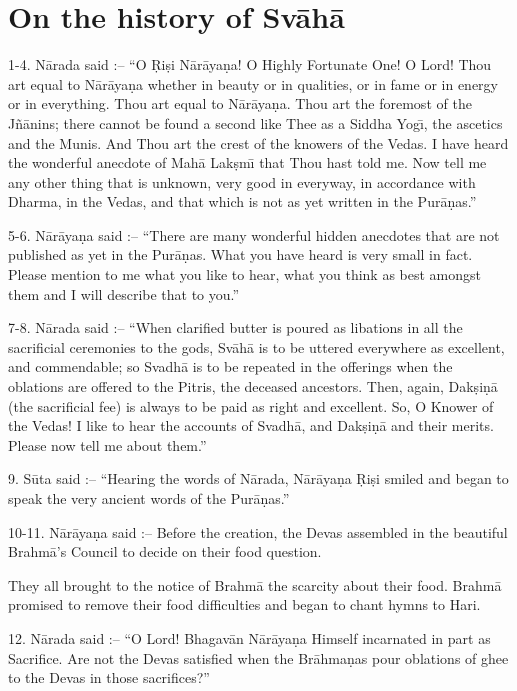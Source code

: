 \chapter{On the history of Sv\=ah\=a}

1-4. N\=arada said :-- ``O \d{R}i\d{s}i N\=ar\=aya\d{n}a! O Highly Fortunate One! O Lord! Thou art equal to N\=ar\=aya\d{n}a whether in beauty or in qualities, or in fame or in energy or in everything. Thou art equal to N\=ar\=aya\d{n}a. Thou art the foremost of the J\~n\=anins; there cannot be found a second like Thee as a Siddha Yog\={\i}, the ascetics and the Munis. And Thou art the crest of the knowers of the Vedas. I have heard the wonderful anecdote of Mah\=a Lak\d{s}m\={\i} that Thou hast told me. Now tell me any other thing that is unknown, very good in everyway, in accordance with Dharma, in the Vedas, and that which is not as yet written in the Pur\=a\d{n}as.''

5-6. N\=ar\=aya\d{n}a said :-- ``There are many wonderful hidden anecdotes that are not published as yet in the Pur\=a\d{n}as. What you have heard is very small in fact. Please mention to me what you like to hear, what you think as best amongst them and I will describe that to you.''

7-8. N\=arada said :-- ``When clarified butter is poured as libations in all the sacrificial ceremonies to the gods, Sv\=ah\=a is to be uttered everywhere as excellent, and commendable; so Svadh\=a is to be repeated in the offerings when the oblations are offered to the Pitris, the deceased ancestors. Then, again, Dak\d{s}i\d{n}\=a (the sacrificial fee) is always to be paid as right and excellent. So, O Knower of the Vedas! I like to hear the accounts of Svadh\=a, and Dak\d{s}i\d{n}\=a and their merits. Please now tell me about them.''

9. S\=uta said :-- ``Hearing the words of N\=arada, N\=ar\=aya\d{n}a \d{R}i\d{s}i smiled and began to speak the very ancient words of the Pur\=a\d{n}as.''

10-11. N\=ar\=aya\d{n}a said :-- Before the creation, the Devas assembled in the beautiful Brahm\=a's Council to decide on their food question.

They all brought to the notice of Brahm\=a the scarcity about their food. Brahm\=a promised to remove their food difficulties and began to chant hymns to Hari.

12. N\=arada said :-- ``O Lord! Bhagav\=an N\=ar\=aya\d{n}a Himself incarnated in part as Sacrifice. Are not the Devas satisfied when the Br\=ahma\d{n}as pour oblations of ghee to the Devas in those sacrifices?''


